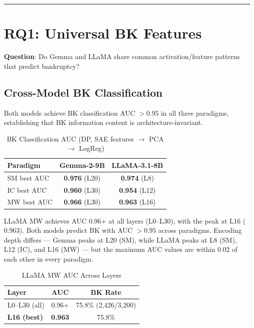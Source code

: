 \documentclass[11pt,a4paper]{article}
\begin{document}
\bigskip\hrule\bigskip

\section{RQ1: Universal BK Features}

\noindent\textbf{Question}: Do Gemma and LLaMA share common activation/feature patterns that predict bankruptcy?

\subsection{Cross-Model BK Classification}

Both models achieve BK classification AUC $> 0.95$ in all three paradigms, establishing that BK information content is architecture-invariant.

\begin{table}[H]
\centering
\caption{BK Classification AUC (DP, SAE features $\rightarrow$ PCA $\rightarrow$ LogReg)}\label{tab:t2}
\footnotesize
\begin{tabular}{lcc}
\toprule
Paradigm & Gemma-2-9B & LLaMA-3.1-8B \\
\midrule
SM best AUC & \textbf{0.976} (L20) & \textbf{0.974} (L8) \\
IC best AUC & \textbf{0.960} (L30) & \textbf{0.954} (L12) \\
MW best AUC & \textbf{0.966} (L30) & \textbf{0.963} (L16) \\
\bottomrule
\end{tabular}
\end{table}

\noindent LLaMA MW achieves AUC $0.96$+ at all layers (L0--L30), with the peak at L16 ($0.963$). Both models predict BK with AUC $> 0.95$ across paradigms. Encoding depth differs --- Gemma peaks at L20 (SM), while LLaMA peaks at L8 (SM), L12 (IC), and L16 (MW) --- but the maximum AUC values are within $0.02$ of each other in every paradigm.

\begin{table}[H]
\centering
\caption{LLaMA MW AUC Across Layers}\label{tab:t3}
\footnotesize
\begin{tabular}{lcc}
\toprule
Layer & AUC & BK Rate \\
\midrule
L0--L30 (all) & $0.96$+ & 75.8\% (2,426/3,200) \\
\textbf{L16 (best)} & \textbf{0.963} & 75.8\% \\
\bottomrule
\end{tabular}
\end{table}
\end{document}

